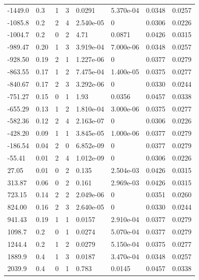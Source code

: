 \documentclass[preview]{standalone}
\begin{document}
{{\begin{tabular}{L{1.2cm}C{1.2cm} C{0.3cm}C{0.5cm} C{1.4cm}C{1.4cm} C{1.4cm}C{1.4cm}}
  -1449.0  &   0.3  & 1     &  3 &  0.0291  & 5.370e-04  & 0.0348 &  0.0257   \\ 
  -1085.8  &   0.2  & 2     &  4 &  2.540e-05  & 0  & 0.0306 &  0.0226   \\ 
  -1004.7  &   0.2  & 0     &  2 &  4.71  & 0.0871  & 0.0426 &  0.0315   \\ 
  -989.47  &  0.20  & 1     &  3 &  3.919e-04  & 7.000e-06  & 0.0348 &  0.0257   \\ 
  -928.50  &  0.19  & 2     &  1 &  1.227e-06  & 0  & 0.0377 &  0.0279   \\ 
  -863.55  &  0.17  & 1     &  2 &  7.475e-04  & 1.400e-05  & 0.0375 &  0.0277   \\ 
  -840.67  &  0.17  & 2     &  3 &  3.292e-06  & 0  & 0.0330 &  0.0244   \\ 
  -751.27  &  0.15  & 0     &  1 &  1.93  & 0.0356  & 0.0457 &  0.0338   \\ 
  -655.29  &  0.13  & 1     &  2 &  1.810e-04  & 3.000e-06  & 0.0375 &  0.0277   \\ 
  -582.36  &  0.12  & 2     &  4 &  2.163e-07  & 0  & 0.0306 &  0.0226   \\ 
  -428.20  &  0.09  & 1     &  1 &  3.845e-05  & 1.000e-06  & 0.0377 &  0.0279   \\ 
  -186.54  &  0.04  & 2     &  0 &  6.852e-09  & 0  & 0.0377 &  0.0279   \\ 
  -55.41  &  0.01  & 2     &  4 &  1.012e-09  & 0  & 0.0306 &  0.0226   \\ 
  27.05  &  0.01  & 0     &  2 &  0.135  & 2.504e-03  & 0.0426 &  0.0315   \\ 
  313.87  &  0.06  & 0     &  2 &  0.161  & 2.969e-03  & 0.0426 &  0.0315   \\ 
  723.15  &  0.14  & 2     &  2 &  2.049e-06  & 0  & 0.0351 &  0.0260   \\ 
  824.00  &  0.16  & 2     &  3 &  2.640e-05  & 0  & 0.0330 &  0.0244   \\ 
  941.43  &  0.19  & 1     &  1 &  0.0157  & 2.910e-04  & 0.0377 &  0.0279   \\ 
  1098.7  &   0.2  & 0     &  1 &  0.0274  & 5.070e-04  & 0.0377 &  0.0279   \\ 
  1244.4  &   0.2  & 1     &  2 &  0.0279  & 5.150e-04  & 0.0375 &  0.0277   \\ 
  1889.9  &   0.4  & 1     &  3 &  0.0187  & 3.470e-04  & 0.0348 &  0.0257   \\ 
  2039.9  &   0.4  & 0     &  1 &  0.783  & 0.0145  & 0.0457 &  0.0338   \\ 

\end{tabular}}}
\end{document}
